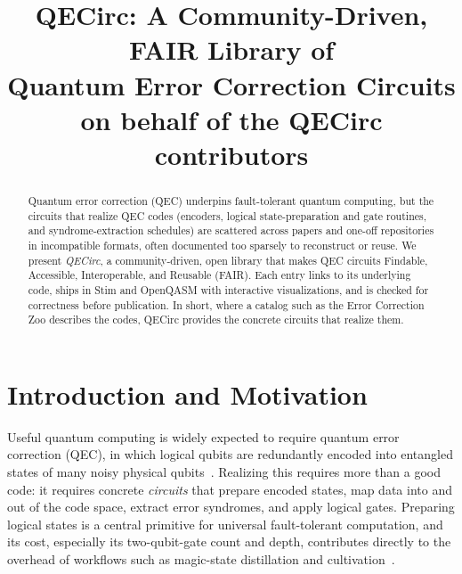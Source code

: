 \documentclass[conference]{IEEEtran}
\begin{document}
\title{QECirc: A Community-Driven, FAIR Library of\\ Quantum Error Correction Circuits\\[2pt]
  \large\normalfont on behalf of the QECirc contributors}

\author{%
}

\maketitle

\begin{abstract}
Quantum error correction (QEC) underpins fault-tolerant quantum computing, but the circuits that realize QEC codes (encoders, logical state-preparation and gate routines, and syndrome-extraction schedules) are scattered across papers and one-off repositories in incompatible formats, often documented too sparsely to reconstruct or reuse. We present \emph{QECirc}, a community-driven, open library that makes QEC circuits Findable, Accessible, Interoperable, and Reusable (FAIR). Each entry links to its underlying code, ships in Stim and OpenQASM with interactive visualizations, and is checked for correctness before publication. In short, where a catalog such as the Error Correction Zoo describes the codes, QECirc provides the concrete circuits that realize them.
\end{abstract}

\section{Introduction and Motivation}
Useful quantum computing is widely expected to require quantum error correction (QEC), in which logical qubits are redundantly encoded into entangled states of many noisy physical qubits~\cite{AF:22}. Realizing this requires more than a good code: it requires concrete \emph{circuits} that prepare encoded states, map data into and out of the code space, extract error syndromes, and apply logical gates. Preparing logical states is a central primitive for universal fault-tolerant computation, and its cost, especially its two-qubit-gate count and depth, contributes directly to the overhead of workflows such as magic-state distillation and cultivation~\cite{PSWH:26}.
\end{document}
